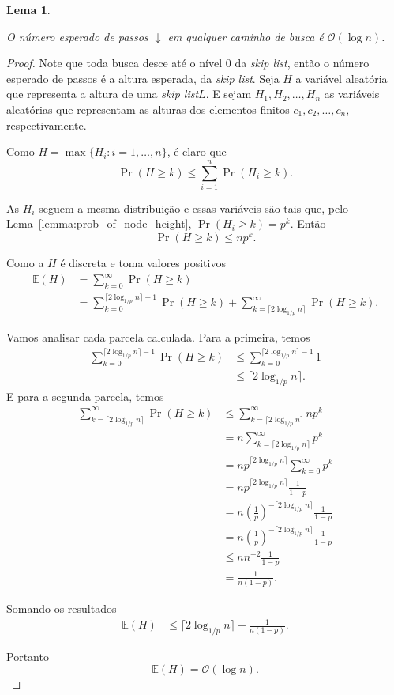 \documentclass[paper=a4, fontsize=11pt]{scrartcl} %
\newtheorem{lemma}[theorem]{Lema}
\numberwithin{equation}{section}
\numberwithin{figure}{section}
\numberwithin{table}{section}
\numberwithin{definition}{section}
\numberwithin{theorem}{section}
\numberwithin{property}{section}
\numberwithin{proposition}{section}
\newcommand{\cO}{\ensuremath{\mathcal{O}}}
\newcommand{\skl}{\textit{skip list}\xspace}
\newcommand{\Exp}{\ensuremath{{\mathbb{E}}}\xspace}
\begin{document}
\begin{lemma} \label{lemma:downarrow}

O número esperado de passos $\downarrow$ em qualquer caminho de busca é $\cO(\log n)$.

\end{lemma}

\begin{proof}

Note que toda busca desce até o nível 0 da \skl, então o número esperado de passos é a altura esperada, da \skl. Seja $H$ a variável aleatória que representa a altura de uma \skl $L$. E sejam 
$H_1, H_2, \ldots, H_n$ as variáveis aleatórias que representam as alturas dos elementos finitos
$c_1, c_2, \ldots, c_n$, respectivamente.

Como $H = \max \{H_i : i = 1, \ldots, n \}$, é claro que
$$
\Pr(H \geq k) \leq \sum_{i=1}^n \Pr(H_i \geq k).
$$

As $H_i$ seguem a mesma distribuição e essas variáveis são tais que, pelo Lema~\ref{lemma:prob_of_node_height},  
 $ \Pr(H_i \geq k) = p^k$. Então
$$
\Pr(H \geq k) \leq np^k.
$$

Como a $H$ é discreta e toma valores positivos
\begin{align*}
\Exp(H) &= \sum_{k = 0}^{\infty} \Pr(H \geq k)  \\
        &= \sum_{k = 0}^{\lceil 2 \log_{1/p} n \rceil - 1} \Pr(H \geq k) +
        \sum_{k = \lceil 2 \log_{1/p} n \rceil}^{\infty} \Pr(H \geq k).
\end{align*}

Vamos analisar cada parcela calculada. Para a primeira, temos
\begin{align*}
\sum_{k = 0}^{\lceil 2 \log_{1/p} n \rceil - 1} \Pr(H \geq k) &\leq 
  \sum_{k = 0}^{\lceil 2 \log_{1/p} n \rceil - 1} 1 \\
&\leq \lceil 2 \log_{1/p} n \rceil.
\end{align*}
E para a segunda parcela, temos
\begin{align*}
\sum_{k = \lceil 2 \log_{1/p} n \rceil}^{\infty} \Pr(H \geq k) 
   &\leq \sum_{k = \lceil 2 \log_{1/p} n \rceil}^{\infty} np^k \\
   &= n \sum_{k = \lceil 2 \log_{1/p} n \rceil}^{\infty} p^k \\
   &= n p^{\lceil 2 \log_{1/p} n \rceil} \sum_{k = 0}^{\infty} p^k \\
   &= n p^{\lceil 2 \log_{1/p} n \rceil} \frac{1}{1 - p} \\
   &= n \left( \frac{1}{p} \right)^{- \lceil 2 \log_{1/p} n \rceil} \frac{1}{1 - p} \\
   &= n \left( \frac{1}{p} \right)^{- \lceil 2 \log_{1/p} n \rceil} \frac{1}{1 - p} \\
   &\leq n n^{-2} \frac{1}{1 - p} \\
   &= \frac{1}{n(1 - p)}.
\end{align*}

Somando os resultados
\begin{align*}
\Exp(H) &\leq \lceil 2 \log_{1/p} n \rceil + \frac{1}{n(1 - p)}.
\end{align*}

Portanto
$$
\Exp(H) = \cO(\log n).
$$
\end{proof}
\end{document}
